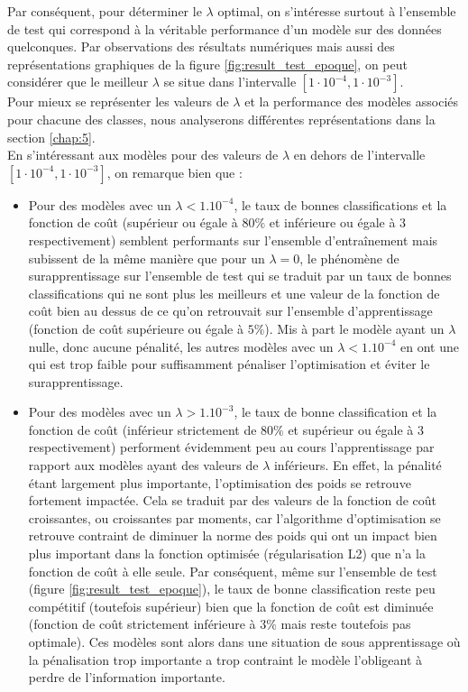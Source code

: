\documentclass[12pt,english, openany]{book}
\begin{document}
Par conséquent, pour déterminer le $\lambda$ optimal, on s'intéresse surtout à l'ensemble de test qui correspond à la véritable performance d'un modèle sur des données quelconques. Par observations des résultats numériques mais aussi des représentations graphiques de la figure \ref{fig:result_test_epoque}, on peut considérer que le meilleur $\lambda$ se situe dans l'intervalle $[1\cdot10^{-4},1\cdot10^{-3}]$.\\

Pour mieux se représenter les valeurs de $\lambda$ et la performance des modèles associés pour chacune des classes, nous analyserons différentes représentations dans la section \ref{chap:5}.\\

En s'intéressant aux modèles pour des valeurs de $\lambda$ en dehors de l'intervalle $[1\cdot10^{-4},1\cdot10^{-3}]$, on remarque bien que :\\

\begin{itemize}
\item Pour des modèles avec un $\lambda < 1.10^{-4}$, le taux de bonnes classifications et la fonction de coût (supérieur ou égale à $80\%$ et inférieure ou égale à $3$ respectivement) semblent performants sur l'ensemble d'entraînement mais subissent de la même manière que pour un $\lambda = 0$, le phénomène de surapprentissage sur l'ensemble de test qui se traduit par un taux de bonnes classifications qui ne sont plus les meilleurs et une valeur de la fonction de coût bien au dessus de ce qu'on retrouvait sur l'ensemble d'apprentissage (fonction de coût supérieure ou égale à $5\%$). Mis à part le modèle ayant un $\lambda$ nulle, donc aucune pénalité, les autres modèles avec un $\lambda < 1.10^{-4}$ en ont une qui est trop faible pour suffisamment pénaliser l'optimisation et éviter le surapprentissage.\\

\item Pour des modèles avec un $\lambda > 1.10^{-3}$, le taux de bonne classification et la fonction de coût (inférieur strictement de $80\%$ et supérieur ou égale à $3$ respectivement) performent évidemment peu au cours l'apprentissage par rapport aux modèles ayant des valeurs de $\lambda$ inférieurs. En effet, la pénalité étant largement plus importante, l'optimisation des poids se retrouve fortement impactée. Cela se traduit par des valeurs de la fonction de coût croissantes, ou croissantes par moments, car l'algorithme d'optimisation se retrouve contraint de diminuer la norme des poids qui ont un impact bien plus important dans la fonction optimisée (régularisation L2) que n'a la fonction de coût à elle seule. Par conséquent, même sur l'ensemble de test (figure \ref{fig:result_test_epoque}), le taux de bonne classification reste peu compétitif (toutefois supérieur) bien que la fonction de coût est diminuée (fonction de coût strictement inférieure à $3\%$ mais reste toutefois pas optimale). Ces modèles sont alors dans une situation de sous apprentissage où la pénalisation trop importante a trop contraint le modèle l'obligeant à perdre de l'information importante.\\ 
\end{itemize}
\end{document}
